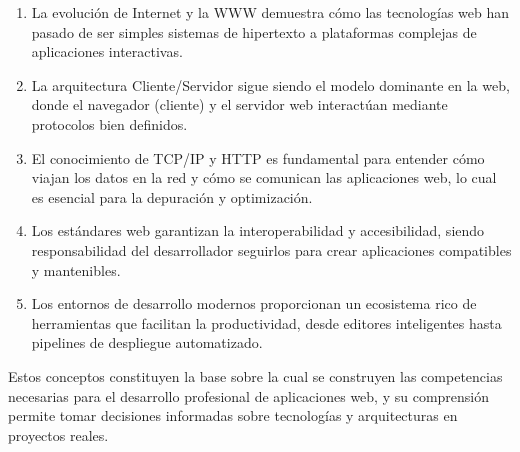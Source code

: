 \documentclass[12pt,letterpaper]{article}
\begin{document}
\begin{enumerate}
    \item La evoluci\'on de Internet y la WWW demuestra c\'omo las tecnolog\'ias web han pasado de ser simples sistemas de hipertexto a plataformas complejas de aplicaciones interactivas.
    
    \item La arquitectura Cliente/Servidor sigue siendo el modelo dominante en la web, donde el navegador (cliente) y el servidor web interact\'uan mediante protocolos bien definidos.
    
    \item El conocimiento de TCP/IP y HTTP es fundamental para entender c\'omo viajan los datos en la red y c\'omo se comunican las aplicaciones web, lo cual es esencial para la depuraci\'on y optimizaci\'on.
    
    \item Los est\'andares web garantizan la interoperabilidad y accesibilidad, siendo responsabilidad del desarrollador seguirlos para crear aplicaciones compatibles y mantenibles.
    
    \item Los entornos de desarrollo modernos proporcionan un ecosistema rico de herramientas que facilitan la productividad, desde editores inteligentes hasta pipelines de despliegue automatizado.
\end{enumerate}

Estos conceptos constituyen la base sobre la cual se construyen las competencias necesarias para el desarrollo profesional de aplicaciones web, y su comprensi\'on permite tomar decisiones informadas sobre tecnolog\'ias y arquitecturas en proyectos reales.
\end{document}
